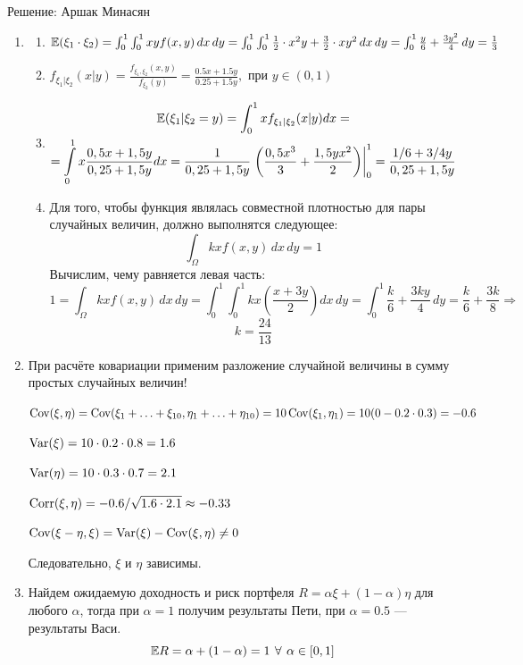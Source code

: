 \documentclass[12pt, a4paper]{article}\usepackage[]{graphicx}\usepackage[]{color}
\begin{document}
Решение: Аршак Минасян


\begin{enumerate}

\item
\begin{enumerate}
\item $ \mathbb{E}({\xi_1 \cdot \xi_2}) = \int_{0}^1 \int_0^1 xy f(x,y) \, dx \, dy = \int_0^1 \int_0^1 \frac{1}{2}\cdot x^2y + \frac{3}{2}\cdot xy^2 \, dx \, dy = \int_{0}^1 \frac{y}{6} + \frac{3y^2}{4} \,dy = \frac{1}{3}$
\item $f_{\xi_1 | \xi_2} (x | y) = \frac{f_{\xi_1, \xi_2}(x, y)}{f_{\xi_2}(y)} = \frac{0.5x + 1.5y}{0.25 + 1.5y}, \text{ при } y \in (0,1)$
\item
\begin{multline*}
\mathbb{E}(\xi_1 | \xi_2 = y) = \int_0^1 x f_{\xi_1 | \xi_2} (x | y) dx = \\
= \int\limits_{0}^{1}  x \frac{0,5x + 1,5y}{0,25 + 1,5y} dx = \frac{1}{0,25 + 1,5y}  \left. \left( \dfrac{0,5x^3}{3} +  \dfrac{1,5yx^2}{2} \right) \right|_0^1  =  \frac{1/6 + 3/4y}{0,25 + 1,5y}
\end{multline*}
\item
Для того, чтобы функция являлась совместной плотностью для пары случайных величин, должно выполнятся следующее:
\[
\int_{\Omega} kx f(x,y) \, dx \, dy = 1
\]
Вычислим, чему равняется левая часть:
\[
1 = \int_{\Omega} kx f(x,y) \, dx \, dy = \int_{0}^1 \int_{0}^1 kx \left(\frac{x + 3y}{2}\right) dx \, dy = \int_{0}^1 \frac{k}{6} + \frac{3ky}{4} \, dy = \frac{k}{6} + \frac{3k}{8} \Rightarrow
\]
\[
k = \frac{24}{13}
\]
\end{enumerate}
\item При расчёте ковариации применим разложение случайной величины в сумму простых случайных величин!

$\operatorname{Cov}(\xi, \eta) = \operatorname{Cov}(\xi_1 + \ldots + \xi_{10}, \eta_1 + \ldots + \eta_{10})=10\operatorname{Cov}(\xi_1, \eta_1)=10(0-0.2\cdot 0.3)=-0.6$

$\operatorname{Var}(\xi)=10\cdot 0.2\cdot 0.8=1.6 $

$\operatorname{Var}(\eta)=10\cdot 0.3\cdot 0.7=2.1 $

$\operatorname{Corr}(\xi,\eta)=-0.6/\sqrt{1.6\cdot 2.1} \approx -0.33 $

$\operatorname{Cov}(\xi - \eta, \xi) = \operatorname{Var}(\xi) - \operatorname{Cov}(\xi, \eta) \neq 0$

Следовательно, $\xi$ и $\eta$ зависимы.

\item Найдем ожидаемую доходность и риск портфеля $R = \alpha \xi + (1-\alpha) \eta$ для любого $\alpha$, тогда при $\alpha = 1$ получим результаты Пети, при $\alpha = 0.5$ — результаты Васи.
\[
\mathbb{E} R = \alpha + (1-\alpha) = 1 \: \, \forall \, \: \alpha \in [0,1]
\]


\end{enumerate}
\end{document}
